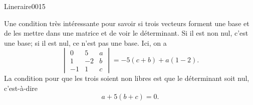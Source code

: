 \begin{corrige}{Lineraire0015}

	Une condition très intéressante pour savoir si trois vecteurs forment une base et de les mettre dans une matrice et de voir le déterminant. Si il est non nul, c'est une base; si il est nul, ce n'est pas une base. Ici, on a
	\begin{equation}
		\begin{vmatrix}
			0	&	5	&	a	\\
			1	&	-2	&	b	\\
			-1	&	1	&	c
		\end{vmatrix}=
		-5(c+b)+a(1-2).
	\end{equation}
	La condition pour que les trois soient non libres est que le déterminant soit nul, c'est-à-dire
	\begin{equation}
		a+5(b+c)=0.
	\end{equation}
	

\end{corrige}
